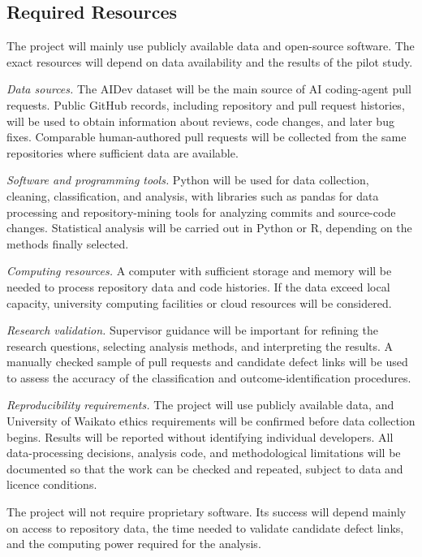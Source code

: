 \documentclass[stu,12pt,donotrepeattitle]{apa7}
\begin{document}
\subsection{Required Resources}

The project will mainly use publicly available data and open-source software. The exact resources will depend on data availability and the results of the pilot study.

\textit{Data sources.} The AIDev dataset \parencite{li2025} will be the main source of AI coding-agent pull requests. Public GitHub records, including repository and pull request histories, will be used to obtain information about reviews, code changes, and later bug fixes. Comparable human-authored pull requests will be collected from the same repositories where sufficient data are available.

\textit{Software and programming tools.} Python will be used for data collection, cleaning, classification, and analysis, with libraries such as pandas for data processing and repository-mining tools for analyzing commits and source-code changes. Statistical analysis will be carried out in Python or R, depending on the methods finally selected.

\textit{Computing resources.} A computer with sufficient storage and memory will be needed to process repository data and code histories. If the data exceed local capacity, university computing facilities or cloud resources will be considered.

\textit{Research validation.} Supervisor guidance will be important for refining the research questions, selecting analysis methods, and interpreting the results. A manually checked sample of pull requests and candidate defect links will be used to assess the accuracy of the classification and outcome-identification procedures.

\textit{Reproducibility requirements.} The project will use publicly available data, and University of Waikato ethics requirements will be confirmed before data collection begins. Results will be reported without identifying individual developers. All data-processing decisions, analysis code, and methodological limitations will be documented so that the work can be checked and repeated, subject to data and licence conditions.

The project will not require proprietary software. Its success will depend mainly on access to repository data, the time needed to validate candidate defect links, and the computing power required for the analysis.
\end{document}
